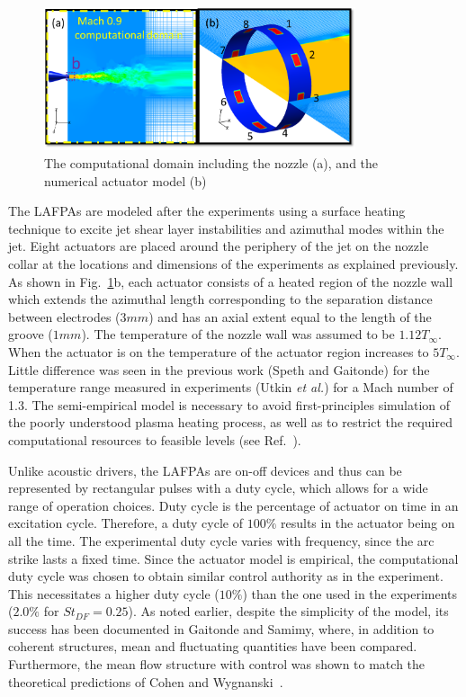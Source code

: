 \documentclass[english]{aiaa-tc}
\begin{document}
\begin{figure}[h]
\begin{center}
\includegraphics[width=3.6in]{actuatormodelnew}
\caption{The computational domain including the nozzle  (a), and the numerical actuator model (b)}\label{fig:actuator}
\end{center}
\end{figure}
The LAFPAs are modeled after the experiments using a surface heating
technique to excite jet shear layer instabilities and azimuthal modes
within the jet.  Eight actuators are placed around the periphery of
the jet on the nozzle collar at the locations and dimensions of the
experiments as explained previously. As shown in
Fig.~\ref{fig:actuator}b, each actuator consists of a heated region of
the nozzle wall which extends the azimuthal length corresponding to
the separation distance between electrodes ($3 mm$) and has an axial
extent equal to the length of the groove ($1 mm$). The temperature of
the nozzle wall was assumed to be $1.12T_{\infty}$.  When the actuator
is on the temperature of the actuator region increases to
$5T_{\infty}$. Little difference was seen in the previous work (Speth
and Gaitonde\cite{SpethASM2012}) for the temperature range measured in
experiments (Utkin {\em et al.}\cite{uyg2007-2}) for a Mach number of
1.3.  The semi-empirical model is necessary to avoid first-principles
simulation of the poorly understood plasma heating process, as well as
to restrict the required computational resources to feasible levels
(see Ref.~).

Unlike acoustic drivers, the LAFPAs are on-off devices and thus can be
represented by rectangular pulses with a duty cycle, which allows for
a wide range of operation choices.  Duty cycle is the percentage of
actuator on time in an excitation cycle. Therefore, a duty cycle
of $100\%$ results in the actuator being on all the time.
The experimental duty cycle varies with frequency, since the arc
strike lasts a fixed time.  Since the actuator
model is empirical, the computational duty cycle was chosen to obtain
similar control authority as in the experiment.  This necessitates a
higher
duty cycle ($10\%$) than the one used in the experiments
($2.0\%$ for $St_{DF}=0.25$).
As noted earlier, despite the simplicity of the model, its success
has been documented in Gaitonde
and Samimy\cite{gdv2011-POF}, where, in addition to coherent
structures, mean and fluctuating quantities have been compared.
Furthermore, the mean flow structure with control was shown to match
the theoretical predictions of Cohen and Wygnanski~\cite{cj87-2}.
\end{document}

